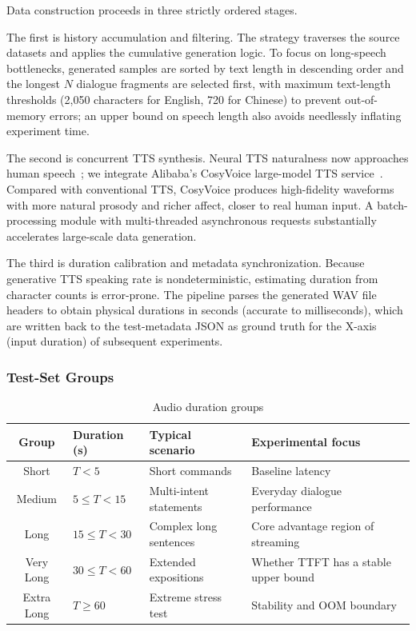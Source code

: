 \documentclass[conference]{IEEEtran}
\begin{document}
Data construction proceeds in three strictly ordered stages.

The first is history accumulation and filtering. The strategy traverses the source datasets and applies the cumulative generation logic. To focus on long-speech bottlenecks, generated samples are sorted by text length in descending order and the longest $N$ dialogue fragments are selected first, with maximum text-length thresholds (2,050 characters for English, 720 for Chinese) to prevent out-of-memory errors; an upper bound on speech length also avoids needlessly inflating experiment time.

The second is concurrent TTS synthesis. Neural TTS naturalness now approaches human speech~\cite{ref16}; we integrate Alibaba's CosyVoice large-model TTS service~\cite{ref17}. Compared with conventional TTS, CosyVoice produces high-fidelity waveforms with more natural prosody and richer affect, closer to real human input. A batch-processing module with multi-threaded asynchronous requests substantially accelerates large-scale data generation.

The third is duration calibration and metadata synchronization. Because generative TTS speaking rate is nondeterministic, estimating duration from character counts is error-prone. The pipeline parses the generated WAV file headers to obtain physical durations in seconds (accurate to milliseconds), which are written back to the test-metadata JSON as ground truth for the X-axis (input duration) of subsequent experiments.

\subsubsection{Test-Set Groups}

\begin{table}[!t]
\caption{Audio duration groups}\label{tab:groups}
\centering
\begin{tabular}{@{}clll@{}}
\toprule
Group & Duration (s) & Typical scenario & Experimental focus \\
\midrule
Short & $T<5$ & Short commands & Baseline latency \\
Medium & $5\leq T<15$ & Multi-intent statements & Everyday dialogue performance \\
Long & $15\leq T<30$ & Complex long sentences & Core advantage region of streaming \\
Very Long & $30\leq T<60$ & Extended expositions & Whether TTFT has a stable upper bound \\
Extra Long & $T\geq60$ & Extreme stress test & Stability and OOM boundary \\
\bottomrule
\end{tabular}
\end{table}
\end{document}
